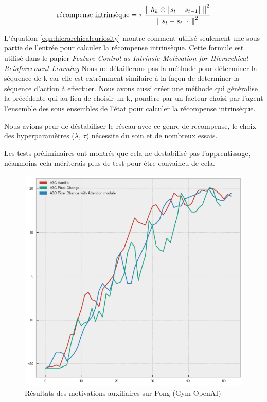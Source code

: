 \begin{equation}\label{eqn:hierarchicalcuriosity}
    \text{récompense intrinsèque} = \tau\: \frac{\left\lVert\: h_k \odot \big[ s_t - s_{t-1} \big] \:\right\rVert^2}{\left\lVert\: s_t - s_{t-1}   \:\right\rVert^2} 
\end{equation}

L'équation \ref{eqn:hierarchicalcuriosity} montre comment utilisé seulement une sous partie de l'entrée pour calculer la récompense intrinsèque. Cette formule est utilisé dans le papier \emph{Feature Control as Intrinsic Motivation for Hierarchical Reinforcement Learning}\cite{hierarchicalcuriosity}
Nous ne détaillerons pas la méthode pour déterminer la séquence de k car elle est extrêmment similaire à la façon de determiner la séquence d'action à effectuer. Nous avons aussi créer une méthode qui généralise la précédente qui au lieu de choisir un k, pondère par un facteur choisi par l'agent l'ensemble des sous ensembles de l'état pour calculer la récompense intrinsèque.

Nous avions peur de déstabiliser le réseau avec ce genre de recompense, le choix des hyperparamètres ($\lambda$, $\tau$) nécessite du soin et de nombreux essais.

Les tests préliminaires ont montrés que cela ne destabilisé pas l'apprentissage, néanmoins cela mériterais plus de test pour être convaincu de cela.

\begin{figure}[h!]
    \begin{center}
        \includegraphics[scale=.35]{./assets/CURIOSITY/A3C_auxiliaire.png}
        \caption{Résultats des motivations auxiliaires sur Pong (Gym-OpenAI)}
    \end{center}
\end{figure}

